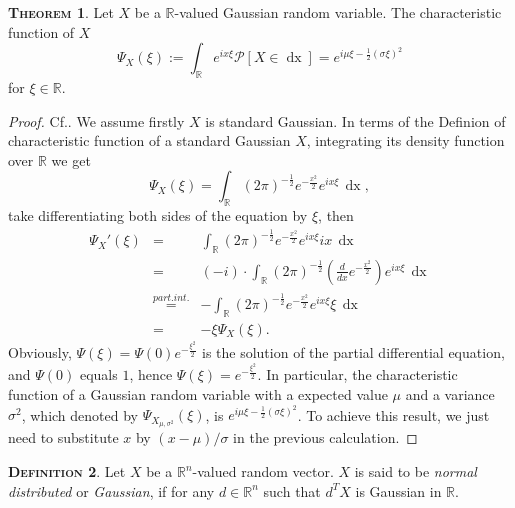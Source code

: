 \documentclass[a4paper, twoside, 11pt]{article}
\theoremstyle{definition}
\newtheorem{definition}{\scshape Definition}[section]
\newtheorem{theorem}[definition]{\scshape Theorem}
\newcommand{\sqbr}[1]{\left[ {#1} \right]}
\begin{document}
\begin{theorem}
  Let $X$ be a $\mathbb{R}$-valued Gaussian random variable. The characteristic function of $X$
\begin{equation}
  \Psi_X(\xi) := \int_\mathbb{R} e^{ix\xi}\mathcal{P}\sqbr{X \in \mathop{dx}} = e^{i\mu\xi-\frac{1}{2}(\sigma\xi)^2}
  \label{sec:cht}
\end{equation}
for $\xi \in \mathbb{R}$.
\label{sec:char}
\end{theorem}
\begin{proof}
  Cf.\cite{shilling}. We assume firstly $X$ is standard Gaussian. In terms of the Definion of characteristic function of a standard Gaussian $X$, integrating its density function over $\mathbb{R}$ we get
  \begin{equation*}
	\Psi_X(\xi) = \int_\mathbb{R} (2\pi)^{-\frac{1}{2}}e^{-\frac{x^2}{2}}e^{ix\xi}\,\mathop{dx},
  \end{equation*}
take differentiating both sides of the equation by $\xi$, then
\begin{eqnarray*}
\Psi_X'(\xi) &=& \int_\mathbb{R}(2\pi)^{-\frac{1}{2}}e^{-\frac{x^2}{2}}e^{ix\xi}ix\,\mathop{dx}\\
             &=& (-i)\cdot\int_\mathbb{R} (2\pi)^{-\frac{1}{2}}(\frac{d}{dx}e^{-\frac{x^2}{2}})e^{ix\xi}\,\mathop{dx}\\
			 &\overset{part.int.}{=}& -\int_\mathbb{R}(2\pi)^{-\frac{1}{2}}e^{-\frac{x^2}{2}}e^{ix\xi}\xi\,\mathop{dx}\\
			 &=& -\xi\Psi_X(\xi).
\end{eqnarray*}
Obviously, 
$\Psi(\xi) = \Psi(0)e^{-\frac{\xi^2}{2}}$ is the solution of the partial differential equation, and $\Psi(0)$ equals $1$, hence $\Psi(\xi) = e^{-\frac{\xi^2}{2}}$.
In particular, the characteristic function of a Gaussian random variable with a expected value $\mu$ and a variance $\sigma^2$, which denoted by $\Psi_{X_{\mu,\sigma^2}}(\xi)$, is $e^{i\mu\xi-\frac{1}{2}(\sigma\xi)^2}$. To achieve this result, we just need to substitute $x$ by $(x-\mu)/\sigma$ in the previous calculation. 
\end{proof}

\begin{definition}
  Let $X$ be a $\mathbb{R}^{n}$-valued random vector. $X$ is said to be \emph{normal distributed} or \emph{Gaussian}, if for any $d \in \mathbb{R}^{n}$ such that $d^TX$ is Gaussian in $\mathbb{R}$.
  \label{sec:g1}
\end{definition}
\end{document}
